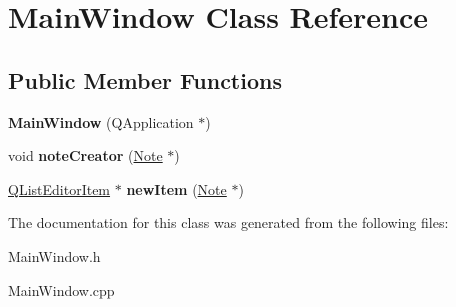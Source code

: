 \hypertarget{classMainWindow}{\section{\-Main\-Window \-Class \-Reference}
\label{classMainWindow}
}
\subsection*{\-Public \-Member \-Functions}
\begin{DoxyCompactItemize}
\item 
\hypertarget{classMainWindow_af9a470d72068ea43f2043b9abbc82bc1}{{\bfseries \-Main\-Window} (\-Q\-Application $\ast$)}\label{classMainWindow_af9a470d72068ea43f2043b9abbc82bc1}

\item 
\hypertarget{classMainWindow_a25bf76ca93b08fc079fd09814152c40c}{void {\bfseries note\-Creator} (\hyperlink{classNote}{\-Note} $\ast$)}\label{classMainWindow_a25bf76ca93b08fc079fd09814152c40c}

\item 
\hypertarget{classMainWindow_a2939ef699376c697046634edaa1307c7}{\hyperlink{classQListEditorItem}{\-Q\-List\-Editor\-Item} $\ast$ {\bfseries new\-Item} (\hyperlink{classNote}{\-Note} $\ast$)}\label{classMainWindow_a2939ef699376c697046634edaa1307c7}

\end{DoxyCompactItemize}


\-The documentation for this class was generated from the following files\-:\begin{DoxyCompactItemize}
\item 
\-Main\-Window.\-h\item 
\-Main\-Window.\-cpp\end{DoxyCompactItemize}
